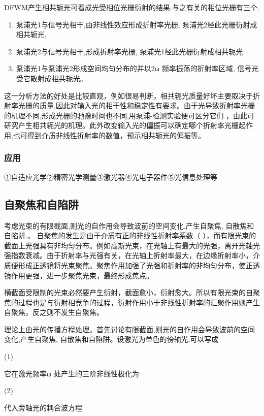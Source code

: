 DFWM产生相共轭光可看成光受相位光栅衍射的结果.与之有关的相位光栅有三个. 
\begin{enumerate}
    \item 泵浦光1与信号光相干,由非线性效应形成折射率光栅, 泵浦光2经此光栅衍射成相共轭光,
    \item 泵浦光2与信号光相干,形成折射率光栅, 泵浦光1经此光栅衍射成相共轭光
    \item 泵浦光1与泵浦光2形成空间均匀分布的并以2ω 频率振荡的折射率区域, 信号光受它散射成相共轭光。
\end{enumerate}

   
这一分析方法的好处是比较直观，例如很易判断，相共轭光质量好坏主要取决于折射率光栅的质量,因此对输入光的相干性和稳定性有要求。由于光导致折射率光栅的机理不同,形成光栅的驰豫时间也不同,用泵浦-检测实验便可区分它们 ，由此可研究产生相共轭光的机理。此外改变输入光的偏振可以确定哪个折射率光栅起作用,也可得到介质非线性折射率的数值，预示相共轭光的偏振等。  

\subsubsection{应用}

①自适应光学②精密光学测量③激光器④光电子器件⑤光信息处理等

\subsection{自聚焦和自陷阱}
考虑光束的有限截面,则光的自作用会导致波前的空间变化,产生自聚焦, 自散焦和自陷阱.。
自聚焦的发生是由于介质有正的非线性折射率系数（ ），而有限光束的截面上光强具有非均匀分布。例如高斯光束，在光轴上有最大的光强，离开光轴光强指数衰减。由于折射率与光强有关，在光轴上折射率最大，在边缘折射率小，介质便形成正透镜将光束聚焦。聚焦作用加强了光强和折射率的非均匀分布，使正透镜作用更强，进一步聚焦光束，最终形成焦点。

横截面受限制的光束必然要产生衍射，截面愈小，衍射愈大。所以有限光束的自聚焦的过程也是与衍射相竞争的过程，衍射作用小于非线性折射率的汇聚作用则产生自聚焦，反之则不发生自聚焦。

理论上由光的传播方程处理。首先讨论有限截面,则光的自作用会导致波前的空间变化,产生自聚焦, 自散焦和自陷阱。设激光为单色的傍轴光,可以写成

              (1)

它在激光频率ω 处产生的三阶非线性极化为

                            (2)

代入旁轴光的耦合波方程

